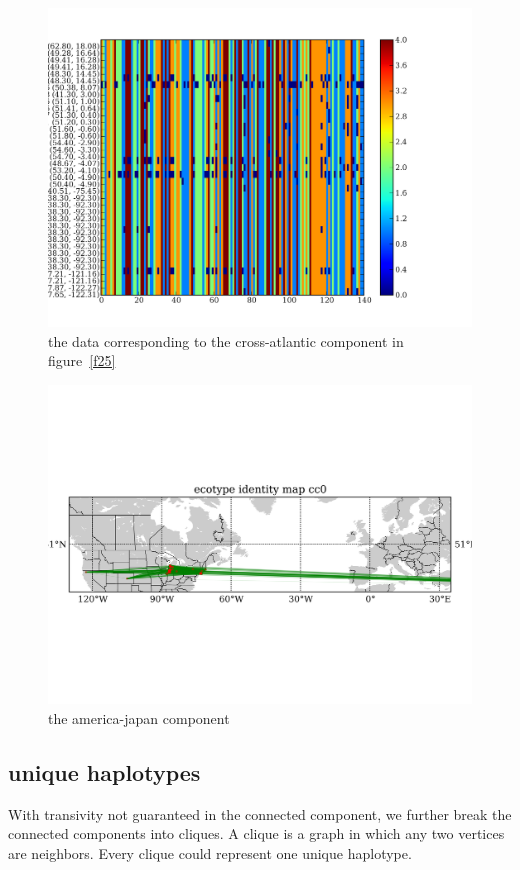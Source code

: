 \documentclass[a4paper,10pt]{article}
\begin{document}
\begin{figure}
\includegraphics[width=1\textwidth]{figures/ecotype_identity_map_cc10.png}
\caption{the data corresponding to the cross-atlantic component in figure~\ref{f25}}\label{f26}
\end{figure}

\begin{figure}
\includegraphics[width=1\textwidth]{figures/ecotype_identity_cc0_site_network.png}
\caption{the america-japan component}\label{f27}
\end{figure}

\subsection{unique haplotypes}
With transivity not guaranteed in the connected component, we further break the connected components into cliques. A clique is a graph in which any two vertices are neighbors. Every clique could represent one unique haplotype.
\end{document}
